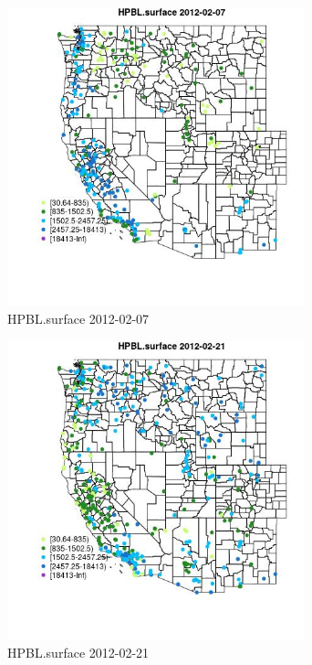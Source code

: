 \begin{figure} 
\centering  
\includegraphics[width=0.77\textwidth]{Code_Outputs/Report_ML_input_PM25_Step4_part_f_de_duplicated_aves_prioritize_24hr_obswNAs_MapObsHPBLsurface2012-02-07.jpg} 
\caption{\label{fig:Report_ML_input_PM25_Step4_part_f_de_duplicated_aves_prioritize_24hr_obswNAsMapObsHPBLsurface2012-02-07}HPBL.surface 2012-02-07} 
\end{figure} 
 

\begin{figure} 
\centering  
\includegraphics[width=0.77\textwidth]{Code_Outputs/Report_ML_input_PM25_Step4_part_f_de_duplicated_aves_prioritize_24hr_obswNAs_MapObsHPBLsurface2012-02-21.jpg} 
\caption{\label{fig:Report_ML_input_PM25_Step4_part_f_de_duplicated_aves_prioritize_24hr_obswNAsMapObsHPBLsurface2012-02-21}HPBL.surface 2012-02-21} 
\end{figure} 
 

